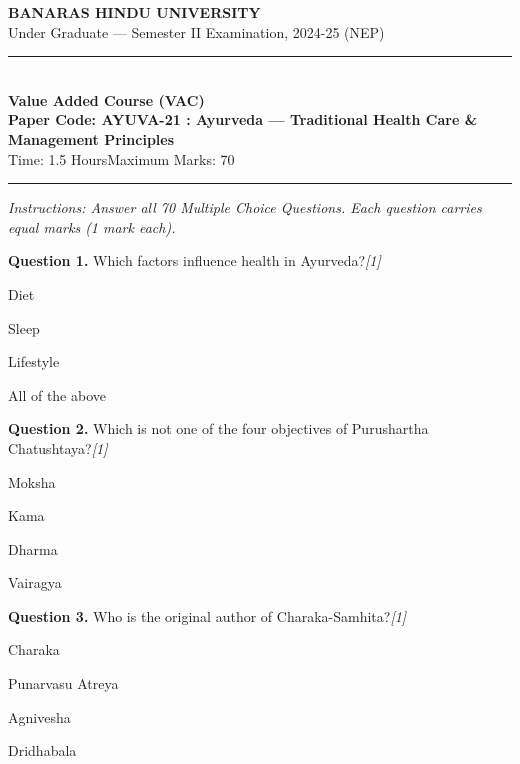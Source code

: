 \documentclass[11pt,a4paper]{article}
\newcommand{\pts}[1]{\hfill   \textit{[#1]}}
\begin{document}
\begin{center}
  {\large\bfseries BANARAS HINDU UNIVERSITY}\\[2pt]
  {\normalsize Under Graduate --- Semester II Examination, 2024-25 (NEP)}\\[6pt]
  \rule{0.8\linewidth}{0.5pt}\\[6pt]
  {\large\bfseries Value Added Course (VAC)}\\[4pt]
  {\large\bfseries Paper Code: AYUVA-21 : Ayurveda --- Traditional Health Care \& Management Principles}\\[4pt]
  {\normalsize Time: 1.5 Hours\hfill Maximum Marks: 70}
\end{center}

\rule{\linewidth}{0.4pt}

\smallskip



\noindent   \textit{Instructions: Answer all 70 Multiple Choice Questions. Each question carries equal marks (1 mark each).}

\bigskip


\noindent   \textbf{Question 1.} Which factors influence health in Ayurveda?\pts{1}

\begin{parts}
  \item Diet
  \item Sleep
  \item Lifestyle
  \item All of the above
\end{parts}

\medskip


\noindent   \textbf{Question 2.} Which is not one of the four objectives of Purushartha Chatushtaya?\pts{1}

\begin{parts}
  \item Moksha
  \item Kama
  \item Dharma
  \item Vairagya
\end{parts}

\medskip


\noindent   \textbf{Question 3.} Who is the original author of Charaka-Samhita?\pts{1}

\begin{parts}
  \item Charaka
  \item Punarvasu Atreya
  \item Agnivesha
  \item Dridhabala
\end{parts}
\end{document}
